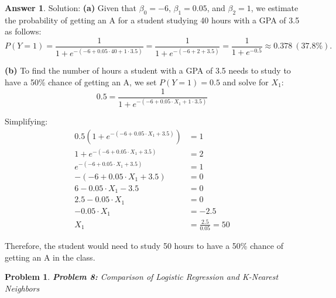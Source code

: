 \documentclass[12pt]{article}
\newtheorem{problem}{Problem} %
\theoremstyle{definition}
\newtheorem*{answer}{Answer}
\newcommand{\solution}{\textcolor{PineGreen}{Solution:\newline}}
\begin{document}
\begin{answer}
\solution
\textbf{(a)} Given that \(\beta_0 = -6\), \(\beta_1 = 0.05\), and \(\beta_2 = 1\), we estimate the probability of getting an A for a student studying 40 hours with a GPA of 3.5 as follows:
\[
    P(Y=1) 
    = \frac{1}{1 + e^{-(-6 + 0.05 \cdot 40 + 1 \cdot 3.5)}} 
    = \frac{1}{1 + e^{-(-6 + 2 + 3.5)}} 
    = \frac{1}{1 + e^{-0.5}} 
    \approx 0.378 \ (\text{37.8\%}).
\]

\textbf{(b)} To find the number of hours a student with a GPA of 3.5 needs to study to have a 50\% chance of getting an A, we set $P(Y=1) = 0.5$ and solve for $X_1$:
\[
0.5 = \frac{1}{1 + e^{-(-6 + 0.05 \cdot X_1 + 1 \cdot 3.5)}}
\]

Simplifying:
\[
\begin{aligned}
0.5(1 + e^{-(-6 + 0.05 \cdot X_1 + 3.5)}) &= 1 \\
1 + e^{-(-6 + 0.05 \cdot X_1 + 3.5)} &= 2 \\
e^{-(-6 + 0.05 \cdot X_1 + 3.5)} &= 1 \\
-(-6 + 0.05 \cdot X_1 + 3.5) &= 0 \\
6 - 0.05 \cdot X_1 - 3.5 &= 0 \\
2.5 - 0.05 \cdot X_1 &= 0 \\
-0.05 \cdot X_1 &= -2.5 \\
X_1 &= \frac{2.5}{0.05} = 50
\end{aligned}
\]

Therefore, the student would need to study 50 hours to have a 50\% chance of getting an A in the class.
\end{answer}

\setcounter{problem}{7}
\begin{problem}
\textbf{Problem 8:} Comparison of Logistic Regression and K-Nearest Neighbors
\end{problem}
\end{document}
